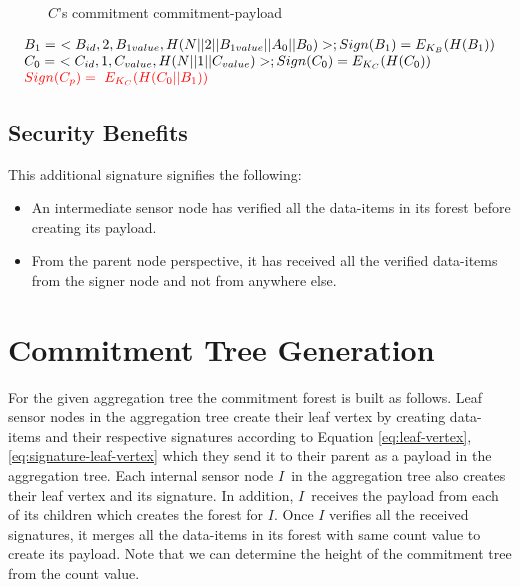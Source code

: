 \begin{exmp}
\begin{figure}[h!]
				\caption{$C$'s commitment commitment-payload}
				\label{fig:Commitment payload of C}
			\end{figure}
		\begin{equation}	
			\begin{array}{l}
				B_{1} =\ <B_{id}, 2, B_{1value}, H(N||2||B_{1value}||A_{0}||B_{0})>; Sign(B_{1}) = E_{K_{B}}(H(B_{1}))\\
				C_{0} =\ <C_{id}, 1, C_{value}, H(N||1||C_{value})>; Sign(C_{0}) = E_{K_{C}}(H(C_{0}))\\
				\textcolor{red}{Sign(C_{p}) =\	E_{K_{C}}(H(C_{0} || B_{1}))}
			\end{array}
		\end{equation}
	\end{exmp}
	\subsection{Security Benefits}

	This additional signature signifies the following:
	\begin{itemize}
		\item	An intermediate sensor node has verified all the data-items in its forest before creating its payload.
		\item From the parent node perspective, it has received all the verified data-items from the signer node and not from anywhere else.
	\end{itemize}

	\section{Commitment Tree Generation}
	For the given aggregation tree the commitment forest is built as follows.
	Leaf sensor nodes in the aggregation tree create their leaf vertex by creating data-items and their respective signatures according to Equation \ref{eq:leaf-vertex}, \ref{eq:signature-leaf-vertex} which they send it to their parent as a payload in the aggregation tree.
	Each internal sensor node $I$\ in the aggregation tree also creates their leaf vertex and its signature.
	In addition, $I$\ receives the payload from each of its children which creates the forest for $I$.
	Once $I$ verifies all the received signatures, it merges all the data-items in its forest with same count value to create its payload.
	Note that we can determine the height of the commitment tree from the count value.

